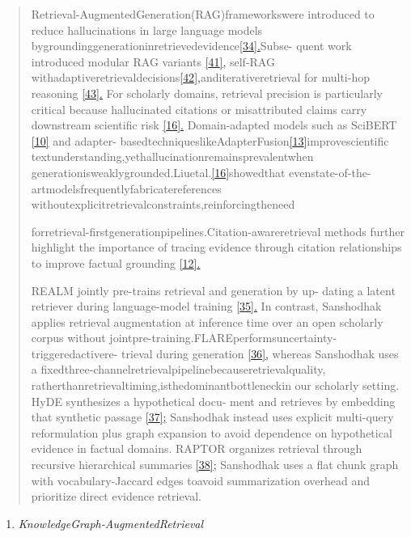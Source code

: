 \documentclass[
]{article}
\begin{document}
\begin{quote}
Retrieval-AugmentedGeneration(RAG)frameworkswere introduced to reduce hallucinations in large language models bygroundinggenerationinretrievedevidence\hyperref[_bookmark42]{{[}34{]}.}Subse- quent work introduced modular RAG variants \hyperref[_bookmark49]{{[}41{]},} self-RAG withadaptiveretrievaldecisions\hyperref[_bookmark50]{{[}42{]},}anditerativeretrieval for multi-hop reasoning \hyperref[_bookmark51]{{[}43{]}.} For scholarly domains, retrieval precision is particularly critical because hallucinated citations or misattributed claims carry downstream scientific risk \hyperref[_bookmark32]{{[}16{]}.} Domain-adapted models such as SciBERT \hyperref[_bookmark28]{{[}10{]}} and adapter- basedtechniqueslikeAdapterFusion\hyperref[_bookmark30]{{[}13{]}}improvescientific textunderstanding,yethallucinationremainsprevalentwhen generationisweaklygrounded.Liuetal.\hyperref[_bookmark32]{{[}16{]}}showedthat evenstate-of-the-artmodelsfrequentlyfabricatereferences withoutexplicitretrievalconstraints,reinforcingtheneed

forretrieval-firstgenerationpipelines.Citation-awareretrieval methods further highlight the importance of tracing evidence through citation relationships to improve factual grounding \hyperref[_bookmark29]{{[}12{]}.}

REALM jointly pre-trains retrieval and generation by up- dating a latent retriever during language-model training \hyperref[_bookmark43]{{[}35{]}.} In contrast, Sanshodhak applies retrieval augmentation at inference time over an open scholarly corpus without jointpre-training.FLAREperformsuncertainty-triggeredactivere- trieval during generation \hyperref[_bookmark44]{{[}36{]},} whereas Sanshodhak uses a fixedthree-channelretrievalpipelinebecauseretrievalquality, ratherthanretrievaltiming,isthedominantbottleneckin our scholarly setting. HyDE synthesizes a hypothetical docu- ment and retrieves by embedding that synthetic passage \hyperref[_bookmark45]{{[}37{]};} Sanshodhak instead uses explicit multi-query reformulation plus graph expansion to avoid dependence on hypothetical evidence in factual domains. RAPTOR organizes retrieval through recursive hierarchical summaries \hyperref[_bookmark46]{{[}38{]};} Sanshodhak uses a flat chunk graph with vocabulary-Jaccard edges toavoid summarization overhead and prioritize direct evidence retrieval.
\end{quote}

\begin{enumerate}
\def\labelenumi{\Alph{enumi}.}
\setcounter{enumi}{2}
\item
  \emph{KnowledgeGraph-AugmentedRetrieval}
\end{enumerate}
\end{document}
